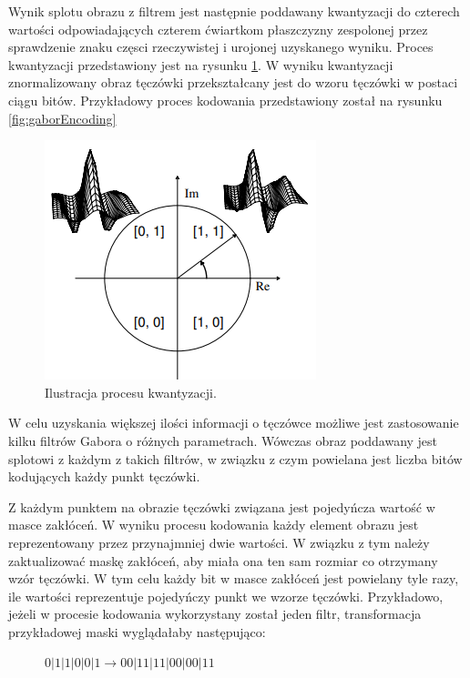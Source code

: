 Wynik splotu obrazu z filtrem jest następnie poddawany kwantyzacji \cite{DaugmanHowIrisRecognitionWorks} do czterech wartości odpowiadających
czterem \'cwiartkom płaszczyzny zespolonej przez sprawdzenie znaku częsci rzeczywistej i urojonej
uzyskanego wyniku. Proces kwantyzacji przedstawiony jest na rysunku \ref{fig:encodingQuant}. W wyniku
kwantyzacji znormalizowany obraz tęczówki przekształcany jest do wzoru tęczówki w postaci ciągu bitów.
Przykładowy proces kodowania przedstawiony został na rysunku \ref{fig:gaborEncoding}

\begin{figure}[ht]
  \centering
  \includegraphics{images/encoding/quantization.png}
  \caption{Ilustracja procesu kwantyzacji.}
  \label{fig:encodingQuant}
\end{figure}

W celu uzyskania większej ilości informacji o tęczówce możliwe jest zastosowanie kilku filtrów
Gabora o różnych parametrach. Wówczas obraz poddawany jest splotowi z każdym z takich filtrów, w
związku z czym powielana jest liczba bitów kodujących każdy punkt tęczówki.

Z każdym punktem na obrazie tęczówki związana jest pojedyńcza wartoś\'c w masce zakłóceń. W wyniku
procesu kodowania każdy element obrazu jest reprezentowany przez przynajmniej dwie wartości. W związku
z tym należy zaktualizowa\'c maskę zakłóceń, aby miała ona ten sam rozmiar co otrzymany wzór tęczówki.
W tym celu każdy bit w masce zakłóceń jest powielany tyle razy, ile wartości reprezentuje pojedyńczy
punkt we wzorze tęczówki. Przykładowo, jeżeli w procesie kodowania wykorzystany został jeden filtr,
transformacja przykładowej maski wyglądałaby następująco:

\begin{figure}[ht]
  \centering
  $0|1|1|0|0|1 \rightarrow 00|11|11|00|00|11$
\end{figure}

